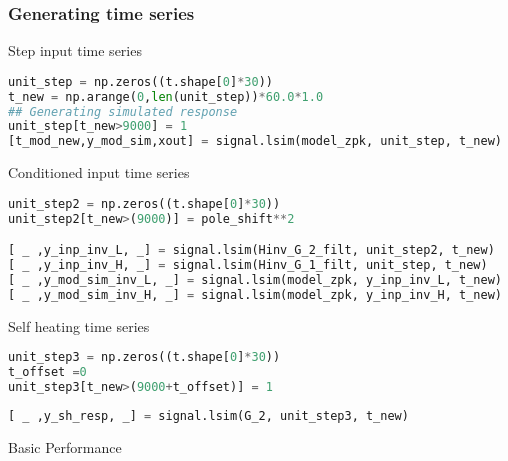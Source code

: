 \subsubsection*{Generating time series}

\noindent Step input time series

\begin{spacing}{1.2} \begin{lstlisting}[frame=single,language=Python]
unit_step = np.zeros((t.shape[0]*30))
t_new = np.arange(0,len(unit_step))*60.0*1.0
## Generating simulated response
unit_step[t_new>9000] = 1
[t_mod_new,y_mod_sim,xout] = signal.lsim(model_zpk, unit_step, t_new)
\end{lstlisting} \end{spacing}


\noindent Conditioned input time series

\begin{spacing}{1.2} \begin{lstlisting}[frame=single,language=Python]
unit_step2 = np.zeros((t.shape[0]*30))
unit_step2[t_new>(9000)] = pole_shift**2

[ _ ,y_inp_inv_L, _] = signal.lsim(Hinv_G_2_filt, unit_step2, t_new)
[ _ ,y_inp_inv_H, _] = signal.lsim(Hinv_G_1_filt, unit_step, t_new)
[ _ ,y_mod_sim_inv_L, _] = signal.lsim(model_zpk, y_inp_inv_L, t_new)
[ _ ,y_mod_sim_inv_H, _] = signal.lsim(model_zpk, y_inp_inv_H, t_new)
\end{lstlisting} \end{spacing}


\noindent Self heating time series

\begin{spacing}{1.2} \begin{lstlisting}[frame=single,language=Python]
unit_step3 = np.zeros((t.shape[0]*30))
t_offset =0
unit_step3[t_new>(9000+t_offset)] = 1
\end{lstlisting} \end{spacing}

\begin{spacing}{1.2} \begin{lstlisting}[frame=single,language=Python]
[ _ ,y_sh_resp, _] = signal.lsim(G_2, unit_step3, t_new)
\end{lstlisting} \end{spacing}

\noindent Basic Performance

